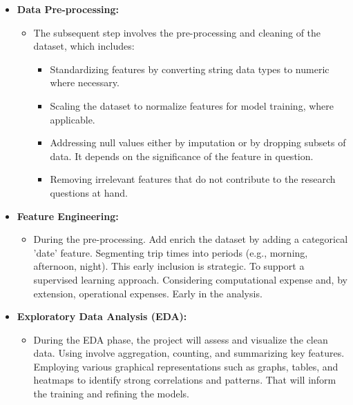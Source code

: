\documentclass[12pt, a4paper]{article}
\begin{document}
\begin{itemize}
        \item \textbf{Data Pre-processing:}
        \begin{itemize}
            \item The subsequent step involves the pre-processing and cleaning of the dataset, which includes:
            \begin{itemize}
                \item Standardizing features by converting string data types to numeric where necessary.
                \item Scaling the dataset to normalize features for model training, where applicable.
                \item Addressing null values either by imputation or by dropping subsets of data. It depends on the significance of the feature in question.
                \item Removing irrelevant features that do not contribute to the research questions at hand.
            \end{itemize}
        \end{itemize}
        \item \textbf{Feature Engineering:}
        \begin{itemize}
            \item During the pre-processing. Add enrich the dataset by adding a categorical 'date' feature. Segmenting trip times into periods (e.g., morning, afternoon, night). \newline This early inclusion is strategic. To support a supervised learning approach. Considering computational expense and, by extension, operational expenses. Early in the analysis.
        \end{itemize}
        \item \textbf{Exploratory Data Analysis (EDA):}
        \begin{itemize}
            \item During the EDA phase, the project will assess and visualize the clean data.
            \newline Using involve aggregation, counting, and summarizing key features. Employing various graphical representations such as graphs, tables, and heatmaps to identify strong correlations and patterns.
            \newline That will inform the training and refining the models.
        \end{itemize}


\end{itemize}
\end{document}
